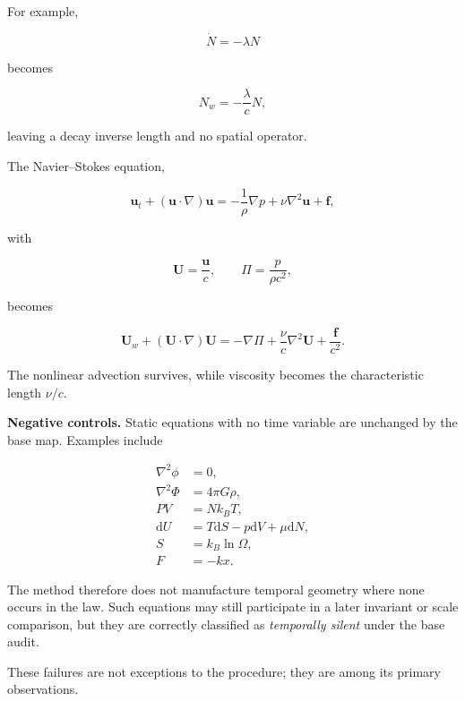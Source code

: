 \documentclass[10pt]{article}
\newcommand{\dd}{\mathrm d}
\newcommand{\grad}{\nabla}
\newcommand{\lap}{\nabla^2}
\newcommand{\vect}[1]{\bm{#1}}
\begin{document}
For example,

\begin{equation}
  \dot N=-\lambda N
\end{equation}

becomes

\begin{equation}
  N_w=-\frac{\lambda}{c}N,
\end{equation}

leaving a decay inverse length and no spatial operator.

The Navier--Stokes equation,

\begin{equation}
  \vect u_t
  +
  (\vect u\!\cdot\grad)\vect u
  =
  -\frac{1}{\rho}\grad p
  +
  \nu\lap\vect u
  +
  \vect f ,
\end{equation}

with

\begin{equation}
  \vect U=\frac{\vect u}{c},
  \qquad
  \Pi=\frac{p}{\rho c^2},
\end{equation}

becomes

\begin{equation}
  \vect U_w
  +
  (\vect U\!\cdot\grad)\vect U
  =
  -\grad\Pi
  +
  \frac{\nu}{c}\lap\vect U
  +
  \frac{\vect f}{c^2}.
\end{equation}

The nonlinear advection survives, while viscosity becomes the
characteristic length \(\nu/c\).

\textbf{Negative controls.}
Static equations with no time variable are unchanged by the base map.
Examples include

\begin{align}
  \lap\phi &= 0,\\
  \lap\Phi &= 4\pi G\rho,\\
  PV &= Nk_BT,\\
  \dd U &= T\dd S-p\dd V+\mu\dd N,\\
  S &= k_B\ln\Omega,\\
  F &= -kx.
\end{align}

The method therefore does not manufacture temporal geometry where
none occurs in the law. Such equations may still participate in a
later invariant or scale comparison, but they are correctly
classified as \emph{temporally silent} under the base audit.

These failures are not exceptions to the procedure; they are among
its primary observations.
\end{document}
